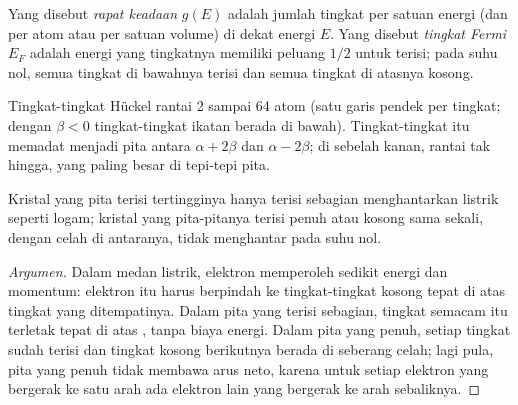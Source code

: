\begin{definition}\label{def:b3:solid-state:fermi}
Yang disebut \emph{rapat keadaan} $g(E)$ adalah jumlah
tingkat per satuan energi (dan per atom atau per satuan volume) di dekat energi $E$.
Yang disebut \emph{tingkat Fermi} $E_F$ adalah energi yang tingkatnya memiliki
peluang $1/2$ untuk terisi; pada suhu nol, semua tingkat di bawahnya
terisi dan semua tingkat di atasnya kosong.
\end{definition}

\begin{omfigure}

{\small Tingkat-tingkat Hückel rantai 2 sampai 64 atom (satu garis pendek per tingkat;
dengan $\beta < 0$ tingkat-tingkat ikatan berada di bawah). Tingkat-tingkat itu memadat menjadi pita
antara $\alpha + 2\beta$ dan $\alpha - 2\beta$; di sebelah kanan,  rantai
tak hingga, yang paling besar di tepi-tepi pita.}
\end{omfigure}

\begin{proposition}\label{prop:b3:solid-state:filling}
Kristal yang pita terisi tertingginya hanya terisi sebagian menghantarkan listrik
seperti logam; kristal yang pita-pitanya terisi penuh atau kosong sama sekali, dengan celah
di antaranya, tidak menghantar pada suhu nol.
\end{proposition}

\begin{proof}[Argumen]
Dalam medan listrik, elektron memperoleh sedikit energi dan momentum: elektron itu harus
berpindah ke tingkat-tingkat kosong tepat di atas tingkat yang ditempatinya. Dalam pita yang
terisi sebagian, tingkat semacam itu terletak tepat di atas , tanpa biaya energi. Dalam
pita yang penuh, setiap tingkat sudah terisi dan tingkat kosong berikutnya berada di seberang celah;
lagi pula, pita yang penuh tidak membawa arus neto, karena untuk setiap elektron yang bergerak
ke satu arah ada elektron lain yang bergerak ke arah sebaliknya.
\end{proof}

